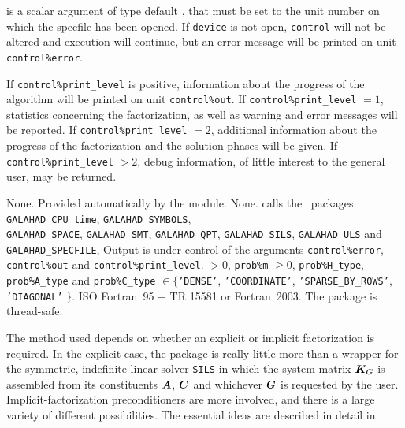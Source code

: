 \documentclass{galahad}
\newcommand{\packagename}{SBLS}
\begin{document}
\begin{description}
 is a scalar \intentin argument of type default \integer,
that must be set to the unit number on which the specfile
has been opened. If {\tt device} is not open, {\tt control} will
not be altered and execution will continue, but an error message
will be printed on unit {\tt control\%error}.

\end{description}


\galinfo
If {\tt control\%print\_level} is positive, information about the progress 
of the algorithm will be printed on unit {\tt control\-\%out}.
If {\tt control\%print\_level} $= 1$, statistics concerning the factorization,
as well as warning and error messages will be reported. 
If {\tt control\%print\_level} $= 2$, additional information about the
progress of the factorization and the solution phases will be given.
If {\tt control\%print\_level} $> 2$, debug information, of little 
interest to the general user, may be returned.


\galgeneral

\galcommon None.
\galworkspace Provided automatically by the module.
\galroutines None. 
\galmodules {\tt \packagename\_solve} calls the \galahad\ packages
{\tt GALAHAD\_CPU\_time},
{\tt GALAHAD\_SY\-M\-BOLS}, \\
{\tt GALAHAD\-\_SPACE},
{\tt GALAHAD\_SMT},
{\tt GALAHAD\_QPT},
{\tt GALAHAD\_SILS},
{\tt GALAHAD\_ULS} and
{\tt GALAHAD\_SPECFILE},
\galio Output is under control of the arguments
 {\tt control\%error}, {\tt control\%out} and {\tt control\%print\_level}.
 $> 0$, {\tt prob\%m} $\geq  0$, 
{\tt prob\%H\_type}, {\tt prob\%A\_type} 
and {\tt prob\%C\_type} $\in \{${\tt 'DENSE'}, 
 {\tt 'COORDINATE'}, {\tt 'SPARSE\_BY\_ROWS'}, {\tt 'DIAGONAL'} $\}$. 
\galportability ISO Fortran~95 + TR 15581 or Fortran~2003. 
The package is thread-safe.


\galmethod
The method used depends on whether an explicit or implicit 
factorization is required. In the explicit case, the 
package is really little more than a wrapper for the
symmetric, indefinite linear solver {\tt SILS} in
which the system matrix ${\bm{K}}_G$ is assembled from its constituents
${\bm{A}}$, ${\bm{C}}$ and whichever ${\bm{G}}$ is requested by the user.
Implicit-factorization preconditioners are more involved,
and there is a large variety of different possibilities. The
essential ideas are described in detail in
\vspace*{1mm}
\end{document}
